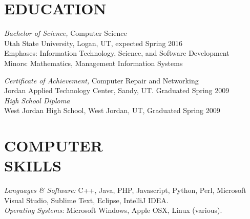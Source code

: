 \documentclass[line,margin]{res}
\begin{document}
\address{655 N.  Darwin Ave., Logan, UT 84321}
\address{(801) 613-0009}


\begin{resume}



\section{EDUCATION} {\sl Bachelor of Science,} Computer Science \\
                Utah State University, Logan, UT,
                expected Spring 2016 \\
                Emphases: Information Technology, Science, and Software Development \\
                Minors: Mathematics, Management Information Systems

                {\sl Certificate of Achievement,} Computer Repair and Networking \\
                Jordan Applied Technology Center, Sandy, UT.
                Graduated Spring 2009 \\

                {\sl High School Diploma} \\
                West Jordan High School, West Jordan, UT,
                Graduated Spring 2009 \\


\section{COMPUTER \\ SKILLS} {\sl Languages \& Software:} C++, Java, PHP, Javascript,
						 Python, Perl, Microsoft Visual Studio, Sublime Text, Eclipse,
						 IntelliJ IDEA. \\
                {\sl Operating Systems:} Microsoft Windows, Apple OSX, Linux (various).


\end{resume}
\end{document}
